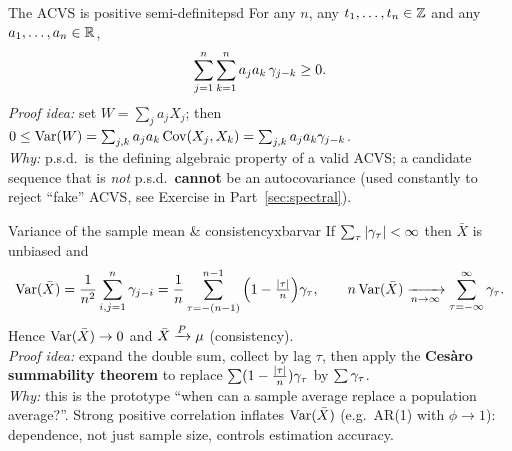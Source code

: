 \begin{proposition}{The ACVS is positive semi-definite}{psd}
For any $n$, any $t_1,\dots,t_n\in\mathbb{Z}$ and any $a_1,\dots,a_n\in\mathbb{R}$,
\[
\sum_{j=1}^n\sum_{k=1}^n a_ja_k\,\gamma_{j-k}\ge0 .
\]
\textit{Proof idea:} set $W=\sum_j a_jX_j$; then
$0\le\operatorname{Var}(W)=\sum_{j,k}a_ja_k\operatorname{Cov}(X_j,X_k)=\sum_{j,k}a_ja_k\gamma_{j-k}$.\\
\textit{Why:} p.s.d.\ is the defining algebraic property of a valid ACVS; a
candidate sequence that is \emph{not} p.s.d.\ \textbf{cannot} be an
autocovariance (used constantly to reject ``fake'' ACVS, see
Exercise in Part~\ref{sec:spectral}).
\end{proposition}

\begin{proposition}{Variance of the sample mean \& consistency}{xbarvar}
If $\sum_{\tau}\left\lvert \gamma_\tau \right\rvert<\infty$ then $\bar X$ is unbiased and
\[
\operatorname{Var}(\bar X)=\frac1{n^2}\sum_{i,j=1}^n\gamma_{j-i}
=\frac1{n}\sum_{\tau=-(n-1)}^{n-1}\Big(1-\tfrac{\left\lvert \tau \right\rvert}{n}\Big)\gamma_\tau,
\qquad
n\operatorname{Var}(\bar X)\xrightarrow[n\to\infty]{}\sum_{\tau=-\infty}^{\infty}\gamma_\tau .
\]
Hence $\operatorname{Var}(\bar X)\to0$ and $\bar X\xrightarrow{P}\mu$ (consistency).\\
\textit{Proof idea:} expand the double sum, collect by lag $\tau$, then apply
the \textbf{Ces\`aro summability theorem} to replace
$\sum(1-\tfrac{\left\lvert \tau \right\rvert}{n})\gamma_\tau$ by $\sum\gamma_\tau$.\\
\textit{Why:} this is the prototype ``when can a sample average replace a
population average?''. Strong positive correlation inflates $\operatorname{Var}(\bar X)$
(e.g.\ AR(1) with $\phi\to1$): dependence, not just sample size, controls
estimation accuracy.
\end{proposition}

